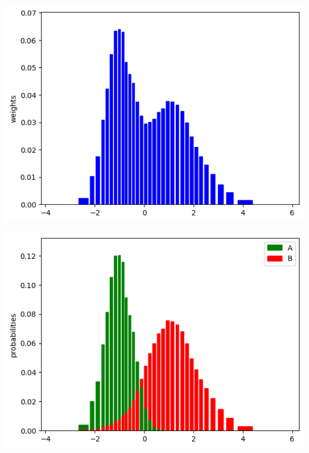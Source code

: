 \begin{exempli_gratia}
\begin{modified}
	\begin{center}
		\begin{minipage}{0.48\textwidth}
			\centering
			\includegraphics[width=\textwidth]{Figures/fused_analysis.png}
		\end{minipage}
		\hfill
		\begin{minipage}{0.48\textwidth}
			\centering
			\includegraphics[width=\textwidth]{Figures/separated_analysis.png}
		\end{minipage}
	\end{center}
	\end{modified}

\end{exempli_gratia}

